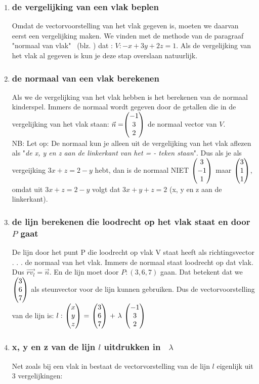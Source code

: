 \documentclass[hidelinks, a4wide, 12pt,  twoside]{book}
\begin{document}
\begin{enumerate}[label=(\alph*)]
\item \subsubsection{de vergelijking van een vlak beplen}
Omdat de vectorvoorstelling van het vlak gegeven is, moeten we daarvan eerst een vergelijking maken.
We vinden met de methode van de paragraaf "normaal van vlak" \ 
(blz. \pageref{vlaknormaal}) dat : $ V: -x + 3y +2z = 1 $.  Als de vergelijking van het vlak al gegeven is kun je deze stap overslaan natuurlijk. 
\item \subsubsection{de normaal van een vlak berekenen}
Als we de vergelijking van het vlak hebben is het berekenen van de normaal kinderspel. Immers de normaal wordt gegeven door de getallen die in de vergelijking van het vlak staan:
$ \vec{n} = \vecdrie{-1}{3}{2}  $ de normaal vector van $ V $.\\
NB: Let op: De normaal kun je alleen uit de vergelijking van het vlak aflezen als "\textit{de x, y en z aan de linkerkant van het = - teken staan}".  Dus als je als vergeijking $ 3x + z = 2 -y $ hebt, dan is de normaal NIET $  \vecdrie{3}{-1}{1}  $ maar  $ \vecdrie{3}{1}{1}  $, omdat uit $ 3x + z = 2 -y $ volgt dat $ 3x + y + z = 2 $ (x, y en z aan de linkerkant).
\item \subsubsection{de lijn berekenen die  loodrecht op het vlak staat  en door $ P $ gaat}
De lijn door het punt P die loodrecht op vlak V staat heeft als richtingsvector . . .  de normaal van het vlak. Immers de normaal staat loodrecht op dat vlak. Dus $ \overrightarrow{rv_{l}}  = \vec{n} $. En de lijn moet door $ P: (3,6,7)  $  gaan. Dat  betekent dat we $ \vecdrie{3}{6}{7} $ als steunvector voor de lijn kunnen gebruiken. Dus de vectorvoorstelling van de lijn is: $ l: \ \vecdrie{x}{y}{z} \ = \ \vecdrie{3}{6}{7} \ + \ \lambda \ \vecdrie{-1}{3}{2} \ $
\item \subsubsection{x, y en z van de lijn $  l $  uitdrukken in \ $  \lambda $}
Net zoals bij een vlak in \RD bestaat de vectorvorstelling van de lijn $ l  $ eigenlijk uit 3 vergelijkingen:

\end{enumerate}
\end{document}
